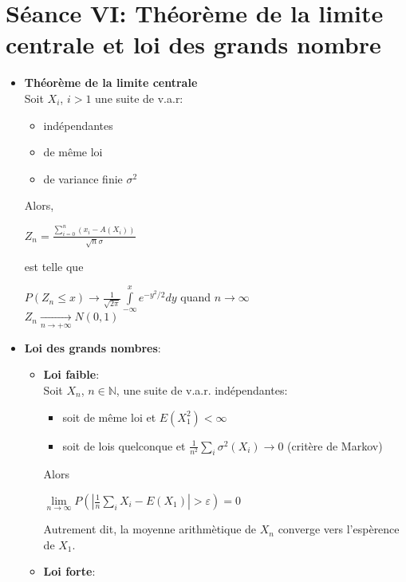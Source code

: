 \documentclass[a4paper,11pt]{report}
\begin{document}
\section{Séance VI: Théorème de la limite centrale et loi des grands nombre}
\begin{itemize}
	\item \textbf{Théorème de la limite centrale} \\
	Soit $X_i$, $i>1$ une suite de v.a.r:
	\begin{itemize}
		\item indépendantes
		\item de même loi
		\item de variance finie $\sigma^2$
	\end{itemize}
	Alors,\\
	\begin{center}
	$Z_n = \frac{\sum\limits_{i=0}^{n}{(x_i-A(X_i))}}{\sqrt{n}\sigma}$
	\end{center}
	est telle que\\
	\begin{center}
	$P(Z_n \le x) \rightarrow \frac{1}{\sqrt{2\pi}}\int\limits_{-\infty}^{x}{e^{-y^2/2}dy}$ quand $n\rightarrow \infty$\\
	$Z_n \underset{n\to+\infty}{\longrightarrow} N(0,1)$
	\end{center}
	\item \textbf{Loi des grands nombres}: \\
	\begin{itemize}
		\item \textbf{Loi faible}:\\
		Soit $X_n$, $n \in \mathbb{N}$, une suite de v.a.r. indépendantes:
		\begin{itemize}
			\item soit de même loi et $E(X_1^2) < \infty$
			\item soit de lois quelconque et $\frac{1}{n^2}\sum\limits_{i}{\sigma^2(X_i) \rightarrow 0}$ (critère de Markov)
		\end{itemize}
		Alors\\
		\begin{center}
		$\lim\limits_{n\rightarrow \infty}{P(|\frac{1}{n}\sum\limits_{i}{X_i}-E(X_1)|>\varepsilon)} = 0$\\
		\end{center}
		Autrement dit, la moyenne arithmètique de $X_n$ converge vers l'espèrence de $X_1$.\\
		\item \textbf{Loi forte}:\\

\end{itemize}
\end{itemize}
\end{document}
